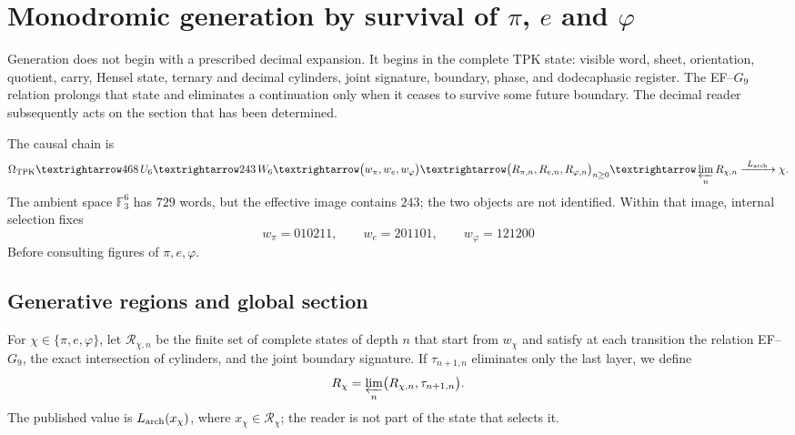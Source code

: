 \chapter{Monodromic generation by survival of
\texorpdfstring{\(\pi\), \(e\) and \(\varphi\)}{pi, e and phi}}
\label{chap:generacion-numeros-rev6}
\label{chap:biografias-numeros-rev6}

Generation does not begin with a prescribed decimal expansion. It begins in
the complete TPK state: visible word, sheet, orientation, quotient,
carry, Hensel state, ternary and decimal cylinders, joint signature,
boundary, phase, and dodecaphasic register. The EF--\(G_9\) relation prolongs that
state and eliminates a continuation only when it ceases to survive some
future boundary. The decimal reader subsequently acts on the section that has
been determined.

The causal chain is
\[
\Omega_{\rm TPK}
\longrightarrow 468\,\mathcal U_6
\longrightarrow 243\,\mathcal W_6
\longrightarrow
\bigl(w_\pi,w_e,w_\varphi\bigr)
\longrightarrow
\bigl(\mathcal R_{\pi,n},\mathcal R_{e,n},
      \mathcal R_{\varphi,n}\bigr)_{n\geq0}
\longrightarrow
\varprojlim_n\mathcal R_{\chi,n}
\xrightarrow{\ L_{\rm arch}\ }
\chi .
\]
The ambient space \(\mathbb F_3^6\) has \(729\) words, but the effective
image contains \(243\); the two objects are not identified. Within that
image, internal selection fixes
\[
w_\pi=010211,\qquad
w_e=201101,\qquad
w_\varphi=121200
\]
Before consulting figures of \(\pi,e,\varphi\).

\section{Generative regions and global section}

\begin{definition}
\label{def:region-generativa-rev6}
For \(\chi\in\{\pi,e,\varphi\}\), let \(\mathcal R_{\chi,n}\) be the
finite set of complete states of depth \(n\) that start from
\(w_\chi\) and satisfy at each transition the relation EF--\(G_9\), the
exact intersection of cylinders, and the joint boundary signature. If
\(\tau_{n+1,n}\) eliminates only the last layer, we define
\[
\mathcal R_\chi
=\varprojlim_n
\bigl(\mathcal R_{\chi,n},\tau_{n+1,n}\bigr).
\]
The published value is \(L_{\rm arch}(x_\chi)\), where
\(x_\chi\in\mathcal R_\chi\); the reader is not part of the state that
selects it.
\end{definition}

